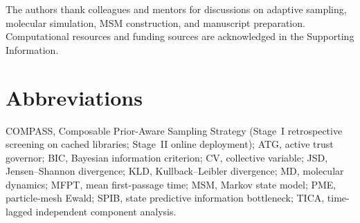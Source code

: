 \documentclass[journal=jctcce,manuscript=article,layout=twocolumn]{achemso}
\begin{document}
The authors thank colleagues and mentors for discussions on adaptive sampling, molecular simulation, MSM construction, and manuscript preparation. Computational resources and funding sources are acknowledged in the Supporting Information.

\section*{Abbreviations}
COMPASS, Composable Prior-Aware Sampling Strategy (Stage~I retrospective screening on cached libraries; Stage~II online deployment); ATG, active trust governor; BIC, Bayesian information criterion; CV, collective variable; JSD, Jensen--Shannon divergence; KLD, Kullback--Leibler divergence; MD, molecular dynamics; MFPT, mean first-passage time; MSM, Markov state model; PME, particle-mesh Ewald; SPIB, state predictive information bottleneck; TICA, time-lagged independent component analysis.


\end{document}
